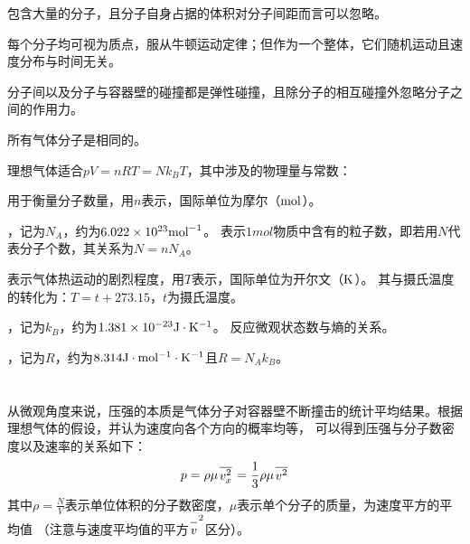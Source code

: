         \begin{Itemize}
            \item 包含大量的分子，且分子自身占据的体积对分子间距而言可以忽略。
            \item 每个分子均可视为质点，服从牛顿运动定律；但作为一个整体，它们随机运动且速度分布与时间无关。
            \item 分子间以及分子与容器壁的碰撞都是弹性碰撞，且除分子的相互碰撞外忽略分子之间的作用力。
            \item 所有气体分子是相同的。
        \end{Itemize}
        \newpage
        理想气体适合\quad$pV=nRT=Nk_{B}T$，其中涉及的物理量与常数：
        \\
        \begin{Itemize}
            \item {}用于衡量分子数量，用$n$表示，国际单位为摩尔（$\rm{mol}$）。
            \item {}，记为$N_{A}$，约为$6.022\times 10^{23}\rm{mol}^{-1}$。
            表示$1mol$物质中含有的粒子数，即若用$N$代表分子个数，其关系为$N=nN_{A}$。
            \item {}表示气体热运动的剧烈程度，用$T$表示，国际单位为开尔文（$\rm{K}$）。
            其与摄氏温度的转化为：$T = t + 273.15$，$t$为摄氏温度。
            \item {}，记为$k_{B}$，约为$1.381\times 10^{-23}\rm{J}\cdot K^{-1}$。
            反应微观状态数与熵的关系。
            \item {}，记为$R$，约为$8.314\rm{J}\cdot mol^{-1}\cdot K^{-1}$且$R=N_{A}k_{B}$。
        \end{Itemize}
    \section[分子动理论]{}
        \subsection[压强的微观解释]{}
            从微观角度来说，压强的本质是气体分子对容器壁不断撞击的统计平均结果。根据理想气体的假设，并认为速度向各个方向的概率均等，
            可以得到压强与分子数密度以及速率的关系如下：
            \begin{equation}
                p = \rho \mu \upperline{v_{x}^{2}}=\frac{1}{3}\rho \mu \upperline{v^{2}}
                \nonumber
            \end{equation}
            其中$\rho = \frac{N}{V}$表示单位体积的分子数密度，$\mu$表示单个分子的质量，为速度平方的平均值
            （注意与速度平均值的平方$\upperline{v}^2$区分）。

